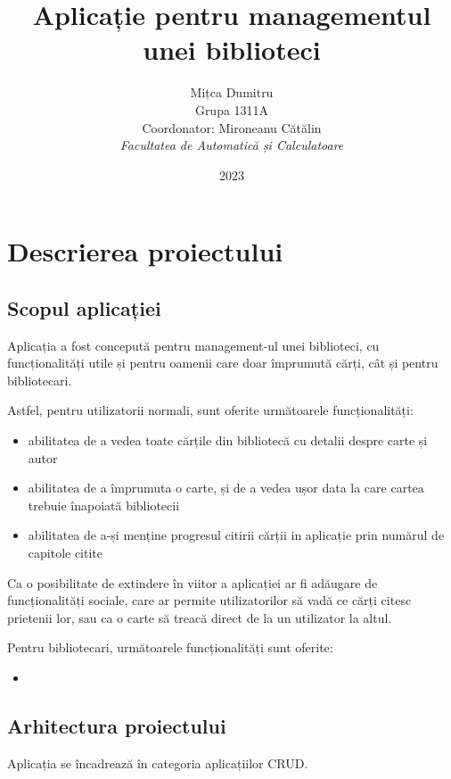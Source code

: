 \documentclass{article}
\title{Aplicație pentru managementul unei biblioteci}
\author{
    Mițca Dumitru\\
    Grupa 1311A\\
    Coordonator: Mironeanu Cătălin\\
    \emph{Facultatea de Automatică și Calculatoare}
}
\date{2023}
\begin{document}
    \maketitle
    \hypersetup{linkbordercolor=1 1 1}
    \renewcommand*\contentsname{Cuprins}
    \tableofcontents
    \hypersetup{linkbordercolor=1 0 0}

    \newpage

    \section{Descrierea proiectului}

    \subsection{Scopul aplicației}

    Aplicația a fost concepută pentru management-ul unei biblioteci, cu funcționalități utile și pentru
    oamenii care doar împrumută cărți, cât și pentru bibliotecari.

    Astfel, pentru utilizatorii normali, sunt oferite următoarele funcționalități:
    \begin{itemize}
        \item abilitatea de a vedea toate cărțile din bibliotecă cu detalii despre carte și autor
        \item abilitatea de a împrumuta o carte, și de a vedea ușor data la care cartea trebuie înapoiată bibliotecii
        \item abilitatea de a-și menține progresul citirii cărții in aplicație prin numărul de capitole citite
    \end{itemize}
    Ca o posibilitate de extindere în viitor a aplicației ar fi adăugare de funcționalități sociale, care ar permite
    utilizatorilor să vadă ce cărți citesc prietenii lor, sau ca o carte să treacă direct de la un utilizator
    la altul.

    Pentru bibliotecari, următoarele funcționalități sunt oferite:
    \begin{itemize}
        \item
    \end{itemize}

    \subsection{Arhitectura proiectului}

    Aplicația se încadrează în categoria aplicațiilor CRUD.
\end{document}
